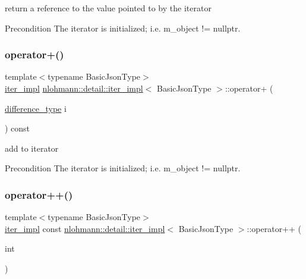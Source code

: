 return a reference to the value pointed to by the iterator 

\begin{DoxyPrecond}{Precondition}
The iterator is initialized; i.\+e. {\ttfamily m\+\_\+object != nullptr}. 
\end{DoxyPrecond}
\mbox{\label{classnlohmann_1_1detail_1_1iter__impl_a8ef76aeb5a5032768f0f61f48ac189c0}} 
\subsubsection{\texorpdfstring{operator+()}{operator+()}}
{\footnotesize\ttfamily template$<$typename Basic\+Json\+Type$>$ \\
\hyperlink{classnlohmann_1_1detail_1_1iter__impl}{iter\+\_\+impl} \hyperlink{classnlohmann_1_1detail_1_1iter__impl}{nlohmann\+::detail\+::iter\+\_\+impl}$<$ Basic\+Json\+Type $>$\+::operator+ (\begin{DoxyParamCaption}\item[{\hyperlink{classnlohmann_1_1detail_1_1iter__impl_a2f7ea9f7022850809c60fc3263775840}{difference\+\_\+type}}]{i }\end{DoxyParamCaption}) const\hspace{0.3cm}{\ttfamily [inline]}}



add to iterator 

\begin{DoxyPrecond}{Precondition}
The iterator is initialized; i.\+e. {\ttfamily m\+\_\+object != nullptr}. 
\end{DoxyPrecond}
\mbox{\label{classnlohmann_1_1detail_1_1iter__impl_a7d2397773b2dce42f30f0375a6a1d850}} 
\subsubsection{\texorpdfstring{operator++()}{operator++()}\hspace{0.1cm}{\footnotesize\ttfamily [1/2]}}
{\footnotesize\ttfamily template$<$typename Basic\+Json\+Type$>$ \\
\hyperlink{classnlohmann_1_1detail_1_1iter__impl}{iter\+\_\+impl} const \hyperlink{classnlohmann_1_1detail_1_1iter__impl}{nlohmann\+::detail\+::iter\+\_\+impl}$<$ Basic\+Json\+Type $>$\+::operator++ (\begin{DoxyParamCaption}\item[{int}]{ }\end{DoxyParamCaption})\hspace{0.3cm}{\ttfamily [inline]}}



